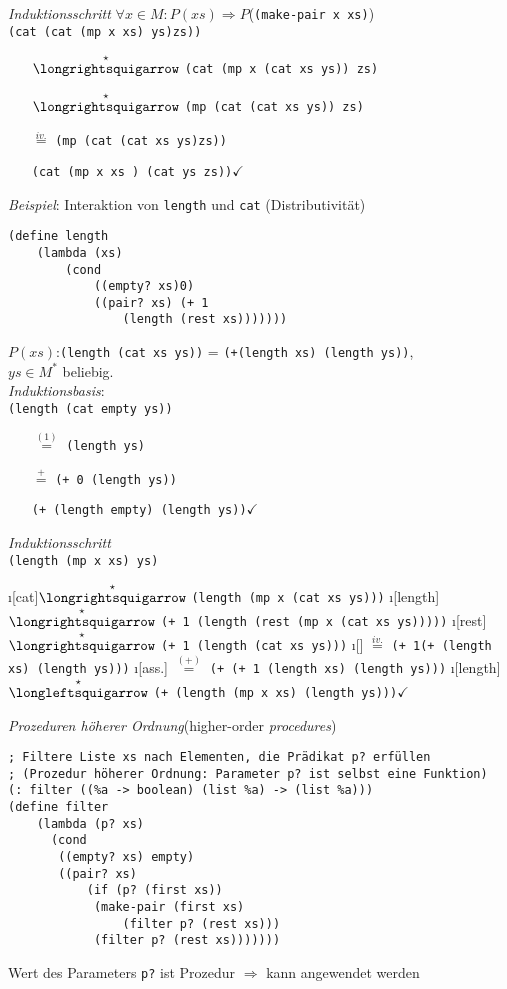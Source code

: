 \emph{Induktionsschritt} $\forall x \in M: P(xs) \Rightarrow P$(\lstinline|(make-pair x xs)|)\\
\lstinline|(cat (cat (mp x xs) ys)zs))|
\begin{enumerate}
\item[$\overset{\star}{\text{\eval}}$] \lstinline|(cat (mp x (cat xs ys)) zs)|
\item[$\overset{\star}{\text{\eval}}$]
\lstinline|(mp (cat (cat xs ys)) zs)|
\item[$\overset{iv.}{=}$] \lstinline|(mp (cat (cat xs ys)zs))|
\item[\reval] \lstinline|(cat (mp x xs ) (cat ys zs))|$\checkmark$
\end{enumerate}
\bigskip
\emph{Beispiel}: Interaktion von \lstinline|length| und \lstinline|cat| (Distributivität)
\begin{lstlisting}
(define length
	(lambda (xs)
		(cond
			((empty? xs)0)
			((pair? xs) (+ 1 
				(length (rest xs)))))))
\end{lstlisting}
$P(xs)$:\lstinline|(length (cat xs ys))| = \lstinline|(+(length xs) (length ys))|,\\
 $ys \in M^*$ beliebig.\\
\emph{Induktionsbasis}:\\
\lstinline|(length (cat empty ys))|
\begin{enumerate}
	\item[$\overset{(1)}{=}$] \lstinline|(length ys)|
	\item[$\overset{+}{=}$] \lstinline|(+ 0 (length ys))|
	\item[\reval] \lstinline|(+ (length empty) (length ys))|$\checkmark$
\end{enumerate}
\emph{Induktionsschritt}\\
\lstinline|(length (mp x xs) ys)|
\begin{enumerate}
	\i[cat]$\overset{\star}{\text{\eval}}$ \lstinline|(length (mp x (cat xs ys)))|
	\i[length]$\overset{\star}{\text{\eval}}$ \lstinline|(+ 1 (length (rest (mp x (cat xs ys)))))|
	\i[rest]$\overset{\star}{\text{\eval}}$ \lstinline|(+ 1 (length (cat xs ys)))|
	\i[] $\overset{iv.}{=}$ \lstinline|(+ 1(+ (length xs) (length ys)))|
	\i[ass.] $\overset{(+)}{=}$ \lstinline|(+ (+ 1 (length xs) (length ys)))|
	\i[length]$\overset{\star}{\text{\reval}}$ \lstinline|(+ (length (mp x xs) (length ys)))|$\checkmark$
\end{enumerate}
\emph{Prozeduren höherer Ordnung}\hfill(higher-order \emph{procedures})
\begin{lstlisting}
; Filtere Liste xs nach Elementen, die Prädikat p? erfüllen
; (Prozedur höherer Ordnung: Parameter p? ist selbst eine Funktion)
(: filter ((%a -> boolean) (list %a) -> (list %a)))
(define filter
	(lambda (p? xs)
	  (cond 
	   ((empty? xs) empty)
	   ((pair? xs)  
		   (if (p? (first xs))
			(make-pair (first xs)
				(filter p? (rest xs)))  
			(filter p? (rest xs)))))))
\end{lstlisting}
Wert des Parameters \lstinline|p?| ist Prozedur $\Rightarrow$ kann angewendet werden